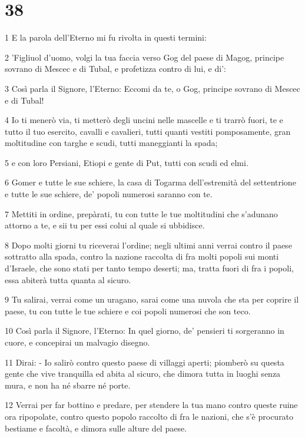 \chapter{38}

\par 1 E la parola dell'Eterno mi fu rivolta in questi termini:
\par 2 'Figliuol d'uomo, volgi la tua faccia verso Gog del paese di Magog, principe sovrano di Mescec e di Tubal, e profetizza contro di lui, e di':
\par 3 Così parla il Signore, l'Eterno: Eccomi da te, o Gog, principe sovrano di Mescec e di Tubal!
\par 4 Io ti menerò via, ti metterò degli uncini nelle mascelle e ti trarrò fuori, te e tutto il tuo esercito, cavalli e cavalieri, tutti quanti vestiti pomposamente, gran moltitudine con targhe e scudi, tutti maneggianti la spada;
\par 5 e con loro Persiani, Etiopi e gente di Put, tutti con scudi ed elmi.
\par 6 Gomer e tutte le sue schiere, la casa di Togarma dell'estremità del settentrione e tutte le sue schiere, de' popoli numerosi saranno con te.
\par 7 Mettiti in ordine, prepàrati, tu con tutte le tue moltitudini che s'adunano attorno a te, e sii tu per essi colui al quale si ubbidisce.
\par 8 Dopo molti giorni tu riceverai l'ordine; negli ultimi anni verrai contro il paese sottratto alla spada, contro la nazione raccolta di fra molti popoli sui monti d'Israele, che sono stati per tanto tempo deserti; ma, tratta fuori di fra i popoli, essa abiterà tutta quanta al sicuro.
\par 9 Tu salirai, verrai come un uragano, sarai come una nuvola che sta per coprire il paese, tu con tutte le tue schiere e coi popoli numerosi che son teco.
\par 10 Così parla il Signore, l'Eterno: In quel giorno, de' pensieri ti sorgeranno in cuore, e concepirai un malvagio disegno.
\par 11 Dirai: - Io salirò contro questo paese di villaggi aperti; piomberò su questa gente che vive tranquilla ed abita al sicuro, che dimora tutta in luoghi senza mura, e non ha né sbarre né porte.
\par 12 Verrai per far bottino e predare, per stendere la tua mano contro queste ruine ora ripopolate, contro questo popolo raccolto di fra le nazioni, che s'è procurato bestiame e facoltà, e dimora sulle alture del paese.
